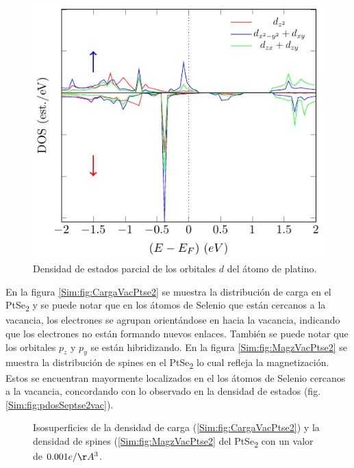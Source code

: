 \begin{figure}[!hbt]
	\centering
	\includegraphics[scale=1]{figRes/PtS2/def/bandas/nosoc/pdosPt_3.pdf}
	\caption[Densidad de estados proyectada en los orbitales $d$ del \'atomo de Platino en el PtS\textsubscript{2} con una vacancia de Platino.]{Densidad de estados parcial de los orbitales $d$ del \'atomo de platino.}
	\label{Sim:fig:pdosPtvacpts2}
\end{figure}

En la figura \ref{Sim:fig:CargaVacPtse2} se muestra la distribuci\'on de carga en el PtSe\textsubscript{2} y se puede notar que en los \'atomos de Selenio que est\'an cercanos a la vacancia, los electrones se agrupan orient\'andose en hacia la vacancia,  indicando que los electrones no est\'an formando nuevos enlaces. Tambi\'en se puede notar que los orbitales $p_z$ y $p_y$ se est\'an  hibridizando. En la figura \ref{Sim:fig:MagzVacPtse2} se muestra la distribuci\'on de spines en el PtSe\textsubscript{2} lo cual refleja la magnetizaci\'on. Estos se encuentran mayormente localizados en el los \'atomos de Selenio cercanos a la vacancia,  concordando con lo observado en la densidad de estados (fig. \ref{Sim:fig:pdosSeptse2vac}).
\begin{figure}[!hbt]
	\centering
  \caption[Iso superficies de la densidad de carga y de spin en el PtSe\textsubscript{2} con vacancia de Platino.]{Isosuperficies de la densidad de carga (\ref{Sim:fig:CargaVacPtse2}) y la densidad de spines (\ref{Sim:fig:MagzVacPtse2} del PtSe\textsubscript{2} con un valor de $0.001 e/\AA^3$. }
\end{figure}


